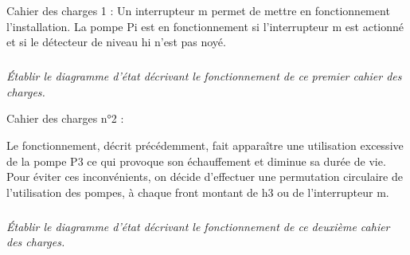 \documentclass[10pt]{article}
\begin{document}
Cahier des charges 1 :
Un interrupteur m permet de mettre en fonctionnement l’installation.
La pompe Pi est en fonctionnement si l’interrupteur m est actionné et si le détecteur de niveau hi
n’est pas noyé.

\subparagraph{}
\textit{Établir le diagramme d’état décrivant le fonctionnement de ce premier cahier des
charges.}

Cahier des charges n°2 :

Le fonctionnement, décrit précédemment, fait apparaître une utilisation excessive de la pompe
P3 ce qui provoque son échauffement et diminue sa durée de vie. Pour éviter ces inconvénients,
on décide d’effectuer une permutation circulaire de l’utilisation des pompes, à chaque front
montant de h3 ou de l’interrupteur m.

\subparagraph{}
\textit{Établir le diagramme d’état décrivant le fonctionnement de ce deuxième cahier des
charges.}
\end{document}
